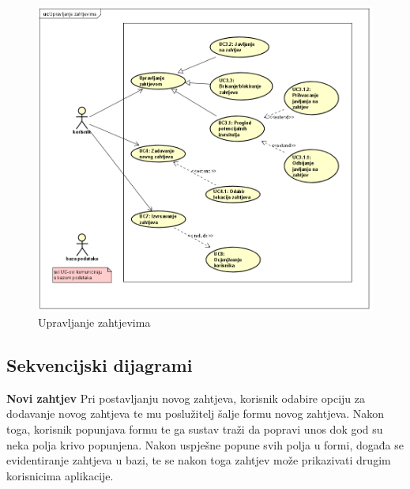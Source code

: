 				
					\begin{figure}[H]
					\includegraphics[scale=0.9]{slike/upravljanje-zahtjevima.png} %
					\centering
					\caption{Upravljanje zahtjevima}
				\end{figure}
				\newpage
				
				
				\eject		
				
			\subsection{Sekvencijski dijagrami}
				
				\noindent \large {\textbf{Novi zahtjev}}
				\newline
				\noindent \normalsize Pri postavljanju novog zahtjeva, korisnik odabire opciju za dodavanje novog zahtjeva te mu poslužitelj šalje formu novog zahtjeva. Nakon toga, korisnik popunjava formu te ga sustav traži da popravi unos dok god su neka polja krivo popunjena. Nakon uspješne popune svih polja u formi, događa se evidentiranje zahtjeva u bazi, te se nakon toga zahtjev može prikazivati drugim korisnicima aplikacije. 
				   
